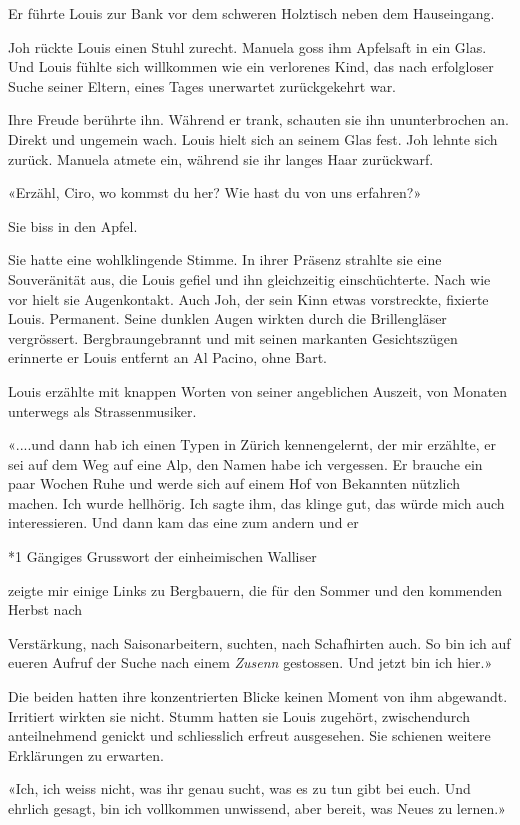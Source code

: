 Er führte Louis zur Bank vor dem schweren Holztisch neben dem
Hauseingang.

Joh rückte Louis einen Stuhl zurecht. Manuela goss ihm Apfelsaft in ein
Glas. Und Louis fühlte sich willkommen wie ein verlorenes Kind, das nach
erfolgloser Suche seiner Eltern, eines Tages unerwartet zurückgekehrt
war.

Ihre Freude berührte ihn. Während er trank, schauten sie ihn
ununterbrochen an. Direkt und ungemein wach. Louis hielt sich an seinem
Glas fest. Joh lehnte sich zurück. Manuela atmete ein, während sie ihr
langes Haar zurückwarf.

«Erzähl, Ciro, wo kommst du her? Wie hast du von uns erfahren?»

Sie biss in den Apfel.

Sie hatte eine wohlklingende Stimme. In ihrer Präsenz strahlte sie eine
Souveränität aus, die Louis gefiel und ihn gleichzeitig einschüchterte.
Nach wie vor hielt sie Augenkontakt. Auch Joh, der sein Kinn etwas
vorstreckte, fixierte Louis. Permanent. Seine dunklen Augen wirkten
durch die Brillengläser vergrössert. Bergbraungebrannt und mit seinen
markanten Gesichtszügen erinnerte er Louis entfernt an Al Pacino, ohne
Bart.

Louis erzählte mit knappen Worten von seiner angeblichen Auszeit, von
Monaten unterwegs als Strassenmusiker.

«....und dann hab ich einen Typen in Zürich kennengelernt, der mir
erzählte, er sei auf dem Weg auf eine Alp, den Namen habe ich vergessen.
Er brauche ein paar Wochen Ruhe und werde sich auf einem Hof von
Bekannten nützlich machen. Ich wurde hellhörig. Ich sagte ihm, das
klinge gut, das würde mich auch interessieren. Und dann kam das eine zum
andern und er

*1 Gängiges Grusswort der einheimischen Walliser

zeigte mir einige Links zu Bergbauern, die für den Sommer und den
kommenden Herbst nach

Verstärkung, nach Saisonarbeitern, suchten, nach Schafhirten auch. So
bin ich auf eueren Aufruf der Suche nach einem \emph{Zusenn} gestossen.
Und jetzt bin ich hier.»

Die beiden hatten ihre konzentrierten Blicke keinen Moment von ihm
abgewandt. Irritiert wirkten sie nicht. Stumm hatten sie Louis zugehört,
zwischendurch anteilnehmend genickt und schliesslich erfreut ausgesehen.
Sie schienen weitere Erklärungen zu erwarten.

«Ich, ich weiss nicht, was ihr genau sucht, was es zu tun gibt bei euch.
Und ehrlich gesagt, bin ich vollkommen unwissend, aber bereit, was Neues
zu lernen.»

